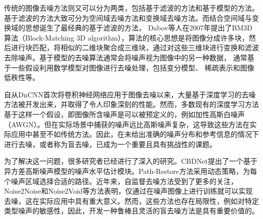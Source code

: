 传统的图像去噪方法则又可以分为两类，包括基于滤波的方法和基于模型的方法。基于滤波的方法大致可分为空间域去噪方法\cite{nlm}和变换域去噪方法\cite{waveletdenoising}。而结合空间域与变换域的思想诞生了最经典的基于滤波的方法， Dabov等人在2007年提出了BM3D 算法（Block-Matching 3D algorithm）\cite{bm3d}，算法的核心思想是将图像分成许多块，然后进行块匹配，将相似的二维块聚合成三维块，通过对这些三维块进行变换和滤波去除噪声。基于模型的去噪算法通常会将噪声视为图像中的另一种数据， 通常基于一些假设利用数学模型对图像进行去噪处理，包括变分模型\cite{totalvariation}、 稀疏表示\cite{ksvd}和图像低秩性\cite{wnnm}等。



自从DnCNN\cite{dncnn}首次将卷积神经网络应用于图像去噪以来，大量基于深度学习的去噪方法\cite{ffdnet, focnet, restormer, swinir}被开发出来，并取得了令人印象深刻的性能。然而，多数现有的深度学习方法基于这样一个假设，即图像所含噪声是可以被预定义的，例如加性高斯白噪声（AWGN）。但在实际场景中捕获的噪声远比高斯噪声复杂，这导致这些方法在实际应用中甚至不如传统方法。因此，在未给出准确的噪声分布和参考信息的情况下进行去噪，或者称为盲去噪，已成为一个重要且具有挑战性的课题。

为了解决这一问题，很多研究者已经进行了深入的研究。CBDNet\cite{cbdnet}提出了一个基于异方差高斯噪声模型的噪声水平估计模块。Path-Restore方法\cite{pathrestore}采用动态策略，为每个噪声区域选择合适的路径。近年来，自监督去噪方法受到了更多的关注，Noise2Noise\cite{noise2noise}和Noise2Void\cite{noise2void}等方法表明，仅通过在噪声图像上进行训练就可以实现去噪，这在实际应用中具有重大意义。然而，这些方法也存在局限性，例如对特定类型噪声的敏感性，因此，开发一种鲁棒且灵活的盲去噪方法是具有重要价值的。

